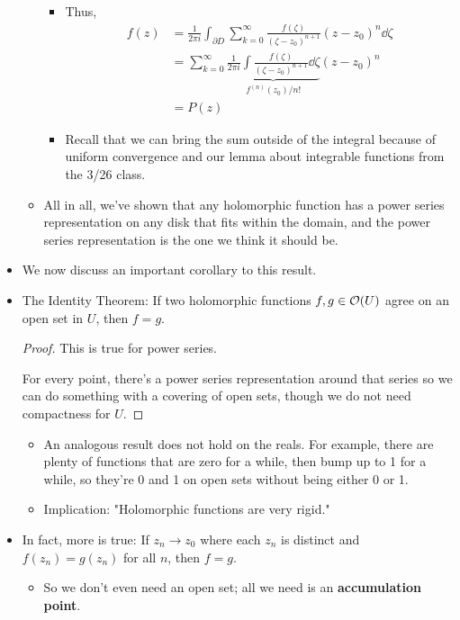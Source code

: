 \documentclass[../notes.tex]{subfiles}
\begin{document}
\begin{itemize}
\begin{itemize}
\begin{itemize}
\begin{equation*}
            \end{equation*}
            \item Thus,
            \begin{align*}
                f(z) &= \frac{1}{2\pi i}\int_{\partial D}\sum_{k=0}^\infty\frac{f(\zeta)}{(\zeta-z_0)^{n+1}}(z-z_0)^n\dd\zeta\\
                &= \sum_{k=0}^\infty\underbrace{\frac{1}{2\pi i}\int\frac{f(\zeta)}{(\zeta-z_0)^{n+1}}\dd\zeta}_{f^{(n)}(z_0)/n!}(z-z_0)^n\\
                &= P(z)
            \end{align*}
            \item Recall that we can bring the sum outside of the integral because of uniform convergence and our lemma about integrable functions from the 3/26 class.
        \end{itemize}
        \item All in all, we've shown that any holomorphic function has a power series representation on any disk that fits within the domain, and the power series representation is the one we think it should be.
    \end{itemize}
    \item We now discuss an important corollary to this result.
    \item The Identity Theorem: If two holomorphic functions $f,g\in\mathcal{O}(U)$ agree on an open set in $U$, then $f=g$.
    \begin{proof}
        This is true for power series.\par
        For every point, there's a power series representation around that series so we can do something with a covering of open sets, though we do not need compactness for $U$.
    \end{proof}
    \begin{itemize}
        \item An analogous result does not hold on the reals. For example, there are plenty of functions that are zero for a while, then bump up to 1 for a while, so they're 0 and 1 on open sets without being either 0 or 1.
        \item Implication: "Holomorphic functions are very rigid."
    \end{itemize}
    \item In fact, more is true: If $z_n\to z_0$ where each $z_n$ is distinct and $f(z_n)=g(z_n)$ for all $n$, then $f=g$.
    \begin{itemize}
        \item So we don't even need an open set; all we need is an \textbf{accumulation point}.

\end{itemize}
\end{itemize}
\end{document}
